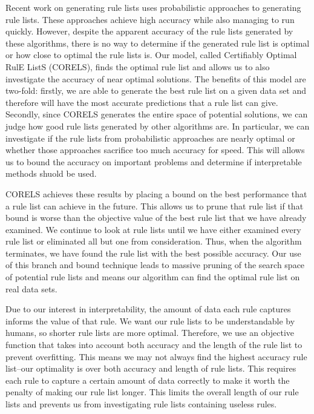 Recent work on generating rule lists \cite{LethamRuMcMa15,YangRuSe16} uses
probabilistic approaches to generating rule lists.
These approaches achieve high accuracy while also managing to run quickly. 
However, despite the apparent accuracy of the rule lists generated by these algorithms, there is no way to determine if the generated rule list is optimal or how close to optimal the rule lists is. 
Our model, called Certifiably Optimal RulE ListS (CORELS), finds the optimal rule list and allows us to also investigate the accuracy of near optimal solutions. 
The benefits of this model are two-fold: firstly, we are able to generate the best rule list on a given data set and therefore will have the most accurate predictions that a rule list can give.
Secondly, since CORELS generates the entire space of potential solutions, we can judge how good rule lists generated by other algorithms are. 
In particular, we can investigate if the rule lists from probabilistic approaches are nearly optimal or whether those approaches sacrifice too much accuracy for speed.
This will allows us to bound the accuracy on important problems and determine if interpretable methods shuold be used.

CORELS achieves these results by placing a bound on the best performance that a rule list can achieve in the future. 
This allows us to prune that rule list if that bound is worse than the objective value of the best rule list that we have already examined.
We continue to look at rule lists until we have either examined every rule list or eliminated all but one from consideration. 
Thus, when the algorithm terminates, we have found the rule list with the best possible accuracy. 
Our use of this branch and bound technique leads to massive pruning of the search space of potential rule lists and means our algorithm can find the optimal rule list on real data sets.

Due to our interest in interpretability, the amount of data each rule captures informs the value of that rule. 
We want our rule lists to be understandable by humans, so shorter rule lists are more optimal. 
Therefore, we use an objective function that takes into account both accuracy and the length of the rule list to prevent overfitting. 
This means we may not always find the highest accuracy rule list--our optimality is over both accuracy and length of rule lists.
This requires each rule to capture a certain amount of data correctly to make it worth the penalty of making our rule list longer. 
This limits the overall length of our rule lists and prevents us from investigating rule lists containing useless rules.

